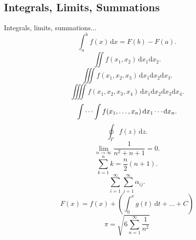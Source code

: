 \documentclass{article}
\begin{document}
        \subsection{Integrals, Limits, Summations}
            Integrals, limits, summations...
            \begin{equation}
                \int_{a}^{b} f(x)\,\text{d}x = F(b) - F(a).
            \end{equation}
            \begin{equation}
                \iint f(x_{1}, x_{2})\,\text{d}x_{1}\text{d}x_{2}.
            \end{equation}
            \begin{equation}
                \iiint f(x_{1}, x_{2}, x_{3})\,\text{d}x_{1}\text{d}x_{2}\text{d}x_{3}.
            \end{equation}
            \begin{equation}
                \iiiint f(x_{1}, x_{2}, x_{3}, x_{4})\,\text{d}x_{1}\text{d}x_{2}\text{d}x_{3}\text{d}x_{4}.
            \end{equation}
            \begin{equation}
                \idotsint f(x_{1}, \dots, x_{n})\,\text{d}x_{1}\cdots\text{d}x_{n}.
            \end{equation}
            \begin{equation}
                \oint_{\Gamma} f(z)\, \text{d}z.
            \end{equation}
            \begin{equation}
                \lim_{n\to\infty} \frac{1}{n^{2} + n + 1} = 0.
            \end{equation}
            \begin{equation}
                \sum_{k=1}^{n} k = \frac{n}{2}(n+1).
            \end{equation}
            \begin{equation}
                \sum_{i=1}^{\infty}\sum_{j=1}^{\infty} \alpha_{ij}.
            \end{equation}
            \begin{equation}
                F(x) = f(x) + \left(\int_{0}^{x} g(t)\,\text{d}t + \dots + C\right)
            \end{equation}
            \begin{equation}
                \pi = \sqrt{6\sum_{n=1}^{\infty} \frac{1}{n^{2}}}
            \end{equation}
\end{document}
